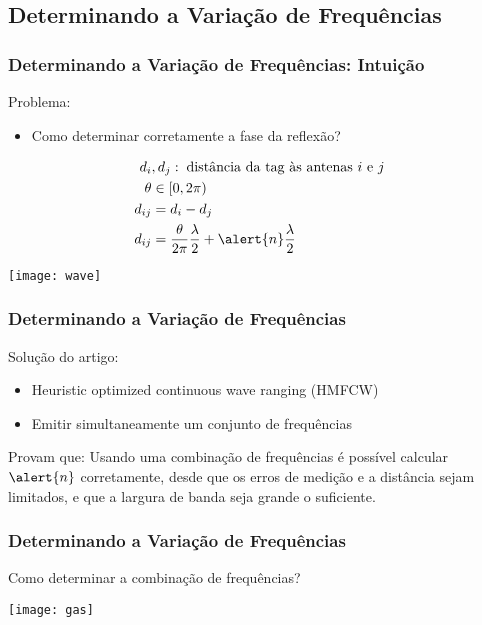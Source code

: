 \subsection{Determinando a Variação de Frequências}
\begin{frame}
    \frametitle{Determinando a Variação de Frequências: Intuição}
    Problema:
    \begin{itemize}
        \item Como determinar corretamente a \alert{fase da reflexão}?
    \end{itemize}
    \begin{align*}
        d_{i}&,d_{j}: \; \text{distância da tag às antenas $i$ e $j$} \\
        \theta& \in [0, 2\pi)\\
        d_{ij} & = d_i - d_j \\
        d_{ij} & = \dfrac{\theta}{2\pi} \dfrac{\lambda}{2} + \alert{n} \dfrac{\lambda}{2}
    \end{align*}

    \pause

    \begin{center}
        \texttt{[image: wave]}
    \end{center}
\end{frame}

\begin{frame}
    \frametitle{Determinando a Variação de Frequências}

    Solução do artigo:
    \begin{itemize}
        \item \alert{Heuristic optimized continuous wave ranging} (HMFCW)
        \item \alert{Emitir simultaneamente um conjunto de frequências}
    \end{itemize}

    \pause

    \begin{block}{Provam que:}
        Usando uma \alert{combinação de frequências} é possível calcular $\alert{n}$ corretamente,
        desde que os \alert{erros de medição} e a \alert{distância} sejam \alert{limitados},
        e que a \alert{largura de banda seja grande o suficiente}.
    \end{block}
\end{frame}

\begin{frame}
    \frametitle{Determinando a Variação de Frequências}
    Como determinar a combinação de frequências?
    \begin{center}
        \texttt{[image: gas]}
    \end{center}
\end{frame}

